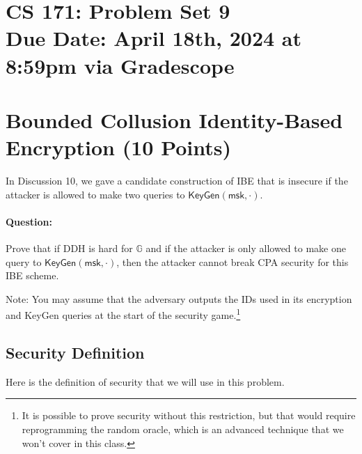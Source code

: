 \documentclass[11pt]{article}
\numberwithin{equation}{section}
\newcommand{\keygen}{\mathsf{KeyGen}}
\newcommand{\msk}{\mathsf{msk}}
\newcommand{\GG}{\mathbb{G}}
\newcommand{\duedate}{April 18th, 2024 at 8:59pm via Gradescope}
\begin{document}
\section*{CS 171: Problem Set 9\\ {\small Due Date: \duedate} }

\section{Bounded Collusion Identity-Based Encryption (10 Points)}
In Discussion 10, we gave a candidate construction of IBE that is insecure if the attacker is allowed to make two queries to $\keygen(\msk, \cdot)$.

\paragraph{Question:} Prove that if DDH is hard for $\GG$ and if the attacker is only allowed to make one query to $\keygen(\msk, \cdot)$, then the attacker cannot break CPA security for this IBE scheme.

Note: You may assume that the adversary outputs the IDs used in its encryption and KeyGen queries at the start of the security game.\footnote{It is possible to prove security without this restriction, but that would require reprogramming the random oracle, which is an advanced technique that we won't cover in this class.}

\subsection*{Security Definition}
Here is the definition of security that we will use in this problem.
\end{document}
